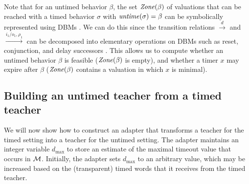 \iflong

\else
Note that for an untimed behavior $\beta$, the set $\mathit{Zone}({\beta})$ of valuations that can be reached with a timed behavior $\sigma$ with $\mathit{untime}(\sigma) = \beta$ can be symbolically represented using DBMs \cite{Di89}.
We can do this since the transition relations $\xrightarrow{d}$ and $\xrightarrow{i_1/o_1, \rho_1}$ can be decomposed 
into elementary operations on DBMs such as reset, conjunction, and delay successors \cite{BengtssonY03}.
This allows us to compute whether an untimed behavior $\beta$ is feasible ($\mathit{Zone}({\beta})$ is empty), and
whether a timer $x$ may expire after $\beta$ ($\mathit{Zone}({\beta})$ contains a valuation in which $x$ is minimal).
\fi

\subsection{Building an untimed teacher from a timed teacher}
We will now show how to construct an adapter that transforms a teacher for the timed setting into a teacher for the untimed setting.
The adapter maintains an integer variable $d_{\max}$ to store an estimate of the maximal timeout value that occurs in ${\mathcal M}$. Initially, the
adapter sets $d_{\max}$ to an arbitrary value, which may be increased based on the (transparent) timed words that it receives from
the timed teacher.

